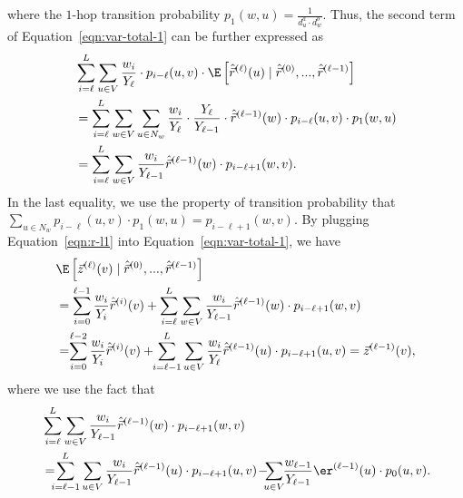 where the $1$-hop transition probability $p_1(w,u)=\frac{1}{d_u^a\cdot d_w^b}$. 
Thus, the second term of Equation~\eqref{eqn:var-total-1} can be further expressed as
\vspace{-2mm}
\begin{equation}\label{eqn:r-l1}
\begin{aligned}
&\sum_{i=\ell}^{L}\sum_{u \in V} \frac{w_i}{Y_{\ell}} \cdot p_{i-\ell}(u,v) \cdot \E \left[\hat{\vec{r}}^{(\ell)}(u) \mid \hat{\vec{r}}^{(0)},...,\hat{\vec{r}}^{(\ell-1)}\right]\\
&=\sum_{i=\ell}^{L}\sum_{w \in V}\sum_{u \in N_w} \frac{w_i}{Y_{\ell}} \cdot \frac{Y_{\ell}}{Y_{\ell-1}} \cdot \hat{\vec{r}}^{(\ell-1)}(w)\cdot p_{i-\ell}(u,v) \cdot p_1(w,u)\\
&=\sum_{i=\ell}^{L}\sum_{w \in V} \frac{w_i}{Y_{\ell-1}}\hat{\vec{r}}^{(\ell-1)}(w)\cdot p_{i-\ell+1}(w,v). 
\end{aligned}
\end{equation}
In the last equality, we use the property of transition probability that $\sum_{u \in N_w}p_{i-\ell}(u,v)\cdot p_1(w,u)=p_{i-\ell+1}(w,v)$. By plugging Equation~\eqref{eqn:r-l1} into Equation~\eqref{eqn:var-total-1}, we have
\begin{equation}\label{eqn:var-total-2}
\begin{aligned}
&\E \left[\vec{z}^{(\ell)}(v) \mid \hat{\vec{r}}^{(0)},...,\hat{\vec{r}}^{(\ell-1)}\right]\\
&=\sum_{i=0}^{\ell-1} \frac{w_i}{Y_i}\hat{\vec{r}}^{(i)}(v)+\sum_{i=\ell}^{L}\sum_{w \in V} \frac{w_i}{Y_{\ell-1}}\hat{\vec{r}}^{(\ell-1)}(w)\cdot p_{i-\ell+1}(w,v)\\
&=\hspace{-1mm}\sum_{i=0}^{\ell-2} \frac{w_i}{Y_i}\hat{\vec{r}}^{(i)}(v)+ \hspace{-1mm}\sum_{i=\ell-1}^{L}\sum_{u \in V} \frac{w_i}{Y_{\ell}} \hat{\vec{r}}^{(\ell-1)}(u) \cdot p_{i-\ell+1}(u,v)
=\vec{z}^{(\ell-1)}(v), 
\end{aligned}
\end{equation}
where we use the fact that
\begin{equation}\nonumber
\begin{aligned}
&\sum_{i=\ell}^{L}\sum_{w \in V} \frac{w_i}{Y_{\ell-1}}\hat{\vec{r}}^{(\ell-1)}(w)\cdot p_{i-\ell+1}(w,v)\\
&=\hspace{-2mm}\sum_{i=\ell-1}^{L}\sum_{u \in V} \frac{w_i}{Y_{\ell-1}}\hat{\vec{r}}^{(\ell-1)}(u)\cdot p_{i-\ell+1}(u,v)\hspace{-0.5mm}-\hspace{-2mm}\sum_{u\in V}\hspace{-1mm}\frac{w_{\ell-1}}{Y_{\ell-1}}\er^{(\ell-1)}(u)\cdot p_0(u,v). 
\end{aligned}
\end{equation}
